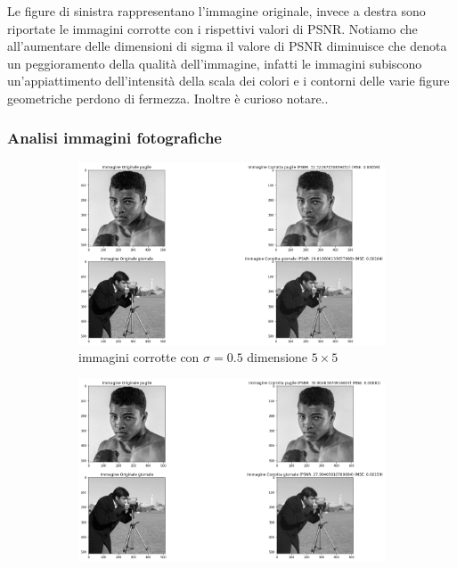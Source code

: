 Le figure di sinistra rappresentano l'immagine originale, invece a destra sono riportate le immagini corrotte con i rispettivi valori di PSNR. 
Notiamo che all'aumentare delle dimensioni di sigma il valore di PSNR diminuisce che denota un peggioramento della qualità dell'immagine, 
infatti le immagini subiscono un'appiattimento dell'intensità della scala dei colori e i contorni delle varie figure geometriche perdono di fermezza. 
Inoltre è curioso notare.. %

\subsubsection{Analisi immagini fotografiche}
\begin{figure}[H]
    \centering
    \begin{subfigure}{0.67\textwidth}
        \centering
        \includegraphics[width=\textwidth]{confrontiPuntoUno/5-0.5-0.02.png}
        \caption{immagini corrotte con $\sigma = 0.5$ dimensione $5 \times 5$}
        \label{fig: fotogrCorrotte5x5}
    \end{subfigure}
    \begin{subfigure}{0.67\textwidth}
        \centering
        \includegraphics[width=\textwidth]{confrontiPuntoUno/7-1-0.02.png}

\end{subfigure}
\end{figure}
